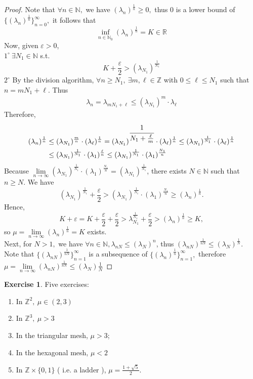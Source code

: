 \documentclass[12pt,a4paper]{report}
\theoremstyle{definition}
\newtheorem{ex}{Exercise}
\begin{document}
	\begin{proof} Note that $\forall n\in \mathbb{N},$ we have $(\lambda_n)^{\frac{1}{n}}\geq 0,$ thus $0$ is a lower bound of $\{(\lambda_n)^{\frac{1}{n}}\}_{n=0}^\infty,$ it follows that 
	\[
	\inf_{n\in\mathbb{N}_0}(\lambda_n)^{\frac{1}{n}}=K\in\mathbb{R}
	\]
	Now, given $\varepsilon>0$,\\ 
	$1^{\circ}\ \exists N_1\in\mathbb{N}$ s.t.\[K+\frac{\varepsilon}{2}>(\lambda_{N_1})^\frac{1}{N_1}\]
	$2^{\circ}$ By the division algorithm, $\forall n\geq N_1,\ \exists m,\ell \in \mathbb{Z}$ with $0\leq \ell\leq N_1$ such that $n=mN_1+\ell$. Thus
	\begin{align*}
	\lambda_n=\lambda_{mN_1+\ell}\leq (\lambda_{N_1})^m\cdot \lambda_\ell
	\end{align*}
	Therefore,
	\begin{align*}
	(\lambda_n)^{\frac{1}{n}}&\leq (\lambda_{N_1})^{\frac{m}{n}}\cdot (\lambda_\ell)^{\frac{1}{n}}=(\lambda_{N_1})^{\cfrac{1}{N_1+\frac{\ell}{m}}}\cdot (\lambda_\ell)^\frac{1}{n}\leq (\lambda_{N_1})^\frac{1}{N_1}\cdot (\lambda_\ell)^\frac{1}{n}\\
	&\leq (\lambda_{N_1})^\frac{1}{N_1}\cdot (\lambda_1)^\frac{\ell}{n}\leq (\lambda_{N_1})^\frac{1}{N_1}\cdot (\lambda_1)^\frac{N_1}{n}
	\end{align*}
	Because $\lim\limits_{n\to\infty}(\lambda_{N_1})^{\frac{1}{N_1}}\cdot (\lambda_1)^{\frac{N_1}{n}}=(\lambda_{N_1})^\frac{1}{N_1}$, there exists $N\in\mathbb{N}$ such that $n\geq N$. We have
	\[
	(\lambda_{N_1})^\frac{1}{N_1}+\frac{\varepsilon}{2}>(\lambda_{N_1})^\frac{1}{N_1}\cdot (\lambda_1)^{\frac{N_1}{n}}\geq (\lambda_n)^{\frac{1}{n}}.
	\]
	Hence, 
	\[
	K+\varepsilon=K+\frac{\varepsilon}{2}+\frac{\varepsilon}{2}>\lambda_{N_1}^{\frac{1}{N_1}}+\frac{\varepsilon}{2}>(\lambda_n)^{\frac{1}{n}}\geq K,
	\]
	so $\mu=\lim\limits_{n\to\infty}(\lambda_n)^\frac{1}{n}=K$ exists.\\
	Next, for $N>1,$ we have $\forall n\in \mathbb{N}, \lambda_{nN}\leq (\lambda_N)^n$, thus $(\lambda_{nN})^\frac{1}{nN}\leq (\lambda_N)^\frac{1}{N}.$ \\
	Note that $\{(\lambda_{nN})^{\frac{1}{nN}}\}_{n=1}^{\infty}$ is a subsequence of $\{(\lambda_{n})^{\frac{1}{n}}\}_{n=1}^{\infty},$ therefore $\mu=\lim\limits_{n\to\infty}(\lambda_{nN})^\frac{1}{nN}\leq (\lambda_N)\frac{1}{N}$
	\end{proof}
	\begin{ex} Five exercises:
	\begin{enumerate}
		\item In $\mathbb{Z}^2,\ \mu\in (2,3)$
		\item In $\mathbb{Z}^3,\ \mu>3$
		\item In the triangular mesh, $\mu>3$;
		\item In the hexagonal mesh, $\mu<2$
		\item In $\mathbb{Z}\times \{0,1\}$ ( i.e. a ladder ), $\mu=\frac{1+\sqrt{5}}{2}.$
	\end{enumerate} 
	\end{ex}
\end{document}
